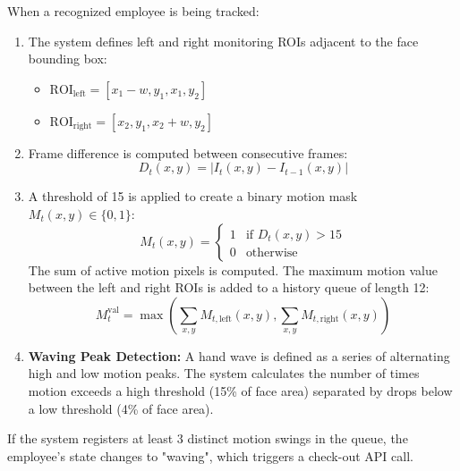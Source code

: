 When a recognized employee is being tracked:
\begin{enumerate}
    \item The system defines left and right monitoring ROIs adjacent to the face bounding box:
    \begin{itemize}
        \item $\text{ROI}_{\text{left}} = [x_1 - w, y_1, x_1, y_2]$
        \item $\text{ROI}_{\text{right}} = [x_2, y_1, x_2 + w, y_2]$
    \end{itemize}
    \item Frame difference is computed between consecutive frames:
    \begin{equation}
        D_t(x, y) = |I_t(x, y) - I_{t-1}(x, y)|
    \end{equation}
    \item A threshold of 15 is applied to create a binary motion mask $M_t(x, y) \in \{0, 1\}$:
    \begin{equation}
        M_t(x, y) = \begin{cases} 1 & \text{if } D_t(x, y) > 15 \\ 0 & \text{otherwise} \end{cases}
    \end{equation}
    The sum of active motion pixels is computed. The maximum motion value between the left and right ROIs is added to a history queue of length 12:
    \begin{equation}
        M^{\text{val}}_t = \max\left( \sum_{x, y} M_{t, \text{left}}(x, y), \sum_{x, y} M_{t, \text{right}}(x, y) \right)
    \end{equation}
    \item \textbf{Waving Peak Detection:} A hand wave is defined as a series of alternating high and low motion peaks. The system calculates the number of times motion exceeds a high threshold (15\% of face area) separated by drops below a low threshold (4\% of face area).
\end{enumerate}
If the system registers at least 3 distinct motion swings in the queue, the employee's state changes to "waving", which triggers a check-out API call.

